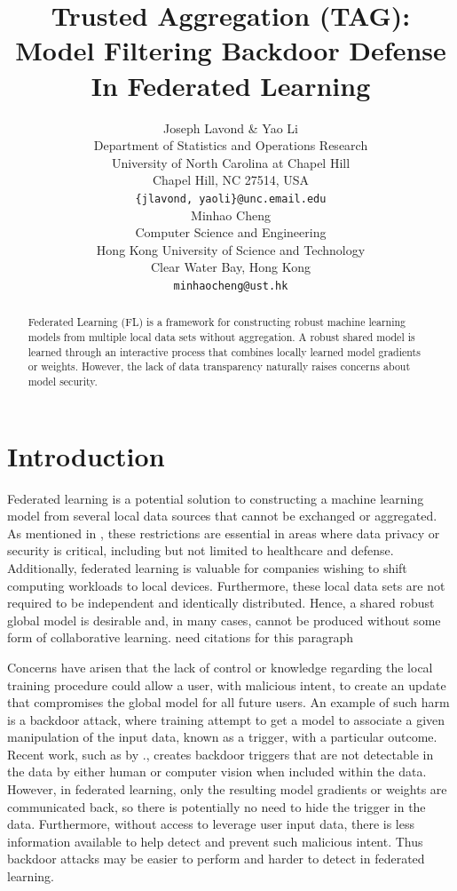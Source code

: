 \documentclass{article} %
\title{
    Trusted Aggregation (TAG): Model Filtering Backdoor Defense In Federated Learning
}
\author{%
    Joseph Lavond \& Yao Li  \\
    Department of Statistics and Operations Research \\
    University of North Carolina at Chapel Hill \\
    Chapel Hill, NC 27514, USA \\
    \texttt{\{jlavond, yaoli\}@unc.email.edu} \\
    \And
    Minhao Cheng \\
    Computer Science and Engineering \\
    Hong Kong University of Science and Technology \\
    Clear Water Bay, Hong Kong \\
    \texttt{minhaocheng@ust.hk}
}
\newcommand{\yli}[1]{{\color{cyan}#1}}
\begin{document}
\maketitle

\begin{abstract}
    Federated Learning (FL) is a framework for constructing robust machine learning models from multiple local data sets without aggregation. A robust shared model is learned through an interactive process that combines locally learned model gradients or weights. However, the lack of data transparency naturally raises concerns about model security.
\end{abstract}



\section{Introduction}

Federated learning is a potential solution to constructing a machine learning model from several local data sources that cannot be exchanged or aggregated. As mentioned in \cite{fed-learn}, these restrictions are essential in areas where data privacy or security is critical, including but not limited to healthcare and defense. Additionally, federated learning is valuable for companies wishing to shift computing workloads to local devices. Furthermore, these local data sets are not required to be independent and identically distributed. Hence, a shared robust global model is desirable and, in many cases, cannot be produced without some form of collaborative learning. \yli{need citations for this paragraph}


Concerns have arisen that the lack of control or knowledge regarding the local training procedure could allow a user, with malicious intent, to create an update that compromises the global model for all future users. An example of such harm is a backdoor attack, where training attempt to get a model to associate a given manipulation of the input data, known as a trigger, with a particular outcome. Recent work, such as by \cite{stamp-invisible}., creates backdoor triggers that are not detectable in the data by either human or computer vision when included within the data. However, in federated learning, only the resulting model gradients or weights are communicated back, so there is potentially no need to hide the trigger in the data. Furthermore, without access to leverage user input data, there is less information available to help detect and prevent such malicious intent. Thus backdoor attacks may be easier to perform and harder to detect in federated learning.
\end{document}
